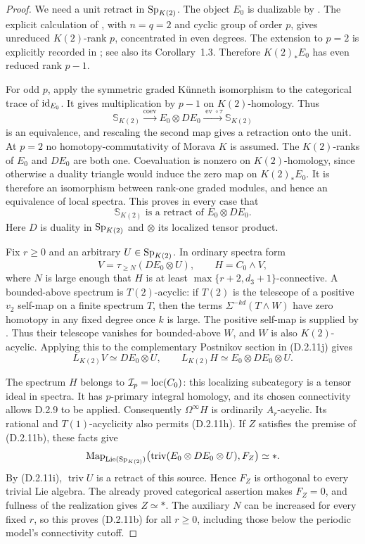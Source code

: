 \begin{proof}
We need a unit retract in $\mathrm{Sp}_{K(2)}$. The object $E_0$ is
dualizable by \cite[Corollary~8.8]{I_HoveyStrickland1999}.
The explicit calculation of
\cite[Theorem~11.1(a)]{I_RavenelWilson1980}, with
$n=q=2$ and cyclic group of order $p$, gives unreduced
$K(2)$-rank $p$, concentrated in even degrees. The extension
to $p=2$ is explicitly recorded in
\cite[Remark~4.4]{I_HopkinsRavenelWilson1998}; see also its
Corollary~1.3. Therefore $K(2)_*E_0$ has even reduced rank
$p-1$.

For odd $p$, apply the symmetric graded K\"unneth isomorphism
to the categorical trace of $\mathrm{id}_{E_0}$. It gives multiplication
by $p-1$ on $K(2)$-homology. Thus
\[
 \mathbb S_{K(2)}\xrightarrow{\operatorname{coev}}
 E_0\otimes DE_0\xrightarrow{\operatorname{ev}\circ\tau}
 \mathbb S_{K(2)}
\]
is an equivalence, and rescaling the second map gives a
retraction onto the unit. At $p=2$ no homotopy-commutativity
of Morava $K$ is assumed. The $K(2)$-ranks of $E_0$ and
$DE_0$ are both one. Coevaluation is nonzero on
$K(2)$-homology, since otherwise a duality triangle would
induce the zero map on $K(2)_*E_0$. It is therefore an
isomorphism between rank-one graded modules, and hence an
equivalence of local spectra. This proves in every case that
\[
 \mathbb S_{K(2)}\text{ is a retract of }E_0\otimes DE_0.
 \tag{D.2.11i}
\]
Here $D$ is duality in $\mathrm{Sp}_{K(2)}$ and $\otimes$ its
localized tensor product.

Fix $r\geq0$ and an arbitrary $U\in\mathrm{Sp}_{K(2)}$. In ordinary
spectra form
\[
 V=\tau_{\geq N}(DE_0\otimes U),\qquad H=C_0\wedge V,
 \tag{D.2.11j}
\]
where $N$ is large enough that $H$ is at least
$\max\{r+2,d_3+1\}$-connective. A bounded-above spectrum
is $T(2)$-acyclic: if $T(2)$ is the telescope of a positive
$v_2$ self-map on a finite spectrum $T$, then the terms
$\Sigma^{-kd}(T\wedge W)$ have zero homotopy in any fixed
degree once $k$ is large. The positive self-map is supplied by
\cite[Theorem~9]{HopkinsSmith1998}. Thus their telescope
vanishes for bounded-above $W$, and $W$ is also
$K(2)$-acyclic. Applying this to the complementary
Postnikov section in \textup{(D.2.11j)} gives
\[
 L_{K(2)}V\simeq DE_0\otimes U,\qquad
 L_{K(2)}H\simeq E_0\otimes DE_0\otimes U.
 \tag{D.2.11k}
\]

The spectrum $H$ belongs to $\mathcal I_p=\operatorname{loc}(C_0)$:
this localizing subcategory is a tensor ideal in spectra.
It has $p$-primary integral homology, and its chosen
connectivity allows D.2.9 to be applied. Consequently
$\Omega^\infty H$ is ordinarily $A_r$-acyclic. Its
rational and $T(1)$-acyclicity also permits
\textup{(D.2.11h)}. If $Z$ satisfies the premise of
\textup{(D.2.11b)}, these facts give
\[
 \operatorname{Map}_{\operatorname{Lie}(\mathrm{Sp}_{K(2)})}
 \bigl(\operatorname{triv}(E_0\otimes DE_0\otimes U),F_Z\bigr)
 \simeq *.
\]
By \textup{(D.2.11i)}, $\operatorname{triv}U$ is a retract
of this source. Hence $F_Z$ is orthogonal to every trivial
Lie algebra. The already proved categorical assertion makes
$F_Z=0$, and fullness of the realization gives $Z\simeq *$.
The auxiliary $N$ can be increased for every fixed $r$, so
this proves \textup{(D.2.11b)} for all $r\geq0$, including
those below the periodic model's connectivity cutoff.


\end{proof}
